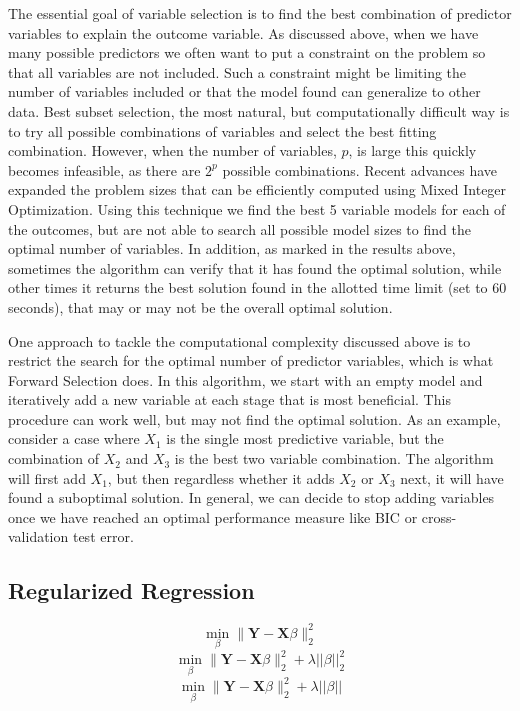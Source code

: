 \documentclass{article}
\newcommand{\bX}{\mathbf{X}}
\newcommand{\bY}{\mathbf{Y}}
\begin{document}
The essential goal of variable selection is to find the best combination of predictor variables to explain the outcome variable. As 
discussed above, when we have many possible predictors we often want to put a constraint on the problem so that all variables 
are not included. Such a constraint might be limiting the number of variables included or that the model found can generalize to 
other data. Best subset selection, the most natural, but computationally difficult way is to try all possible combinations of variables and select the best fitting combination. However, when the number of variables, $p$, is large this quickly becomes infeasible, as there are $2^p$ possible combinations. Recent advances have expanded the problem sizes that can be efficiently computed using Mixed Integer Optimization. Using this technique we find the best 5 variable models for each of the outcomes, but are not able to search all possible model sizes to find the optimal number of variables. In addition, as marked in the results above, sometimes the algorithm can verify that it has found the optimal solution, while other times it returns the best solution found in the allotted time limit (set to 60 seconds), that may or may not be the overall optimal solution.

One approach to tackle the computational complexity discussed above is to restrict the search for the optimal number of 
predictor variables, which is what Forward Selection does. In this algorithm, we start with an empty model and iteratively add a 
new variable at each stage that is most beneficial. This procedure can work well, but may not find the optimal solution. As an example, consider a case where $X_1$ is the single most predictive variable, but the combination of $X_2$ and $X_3$ is the best two variable combination. The algorithm will first add $X_1$, but then regardless whether it adds $X_2$ or $X_3$ next, it will have found a suboptimal solution. In general, we can decide to stop adding variables once we have reached an optimal performance measure like BIC or cross-validation test error.


\subsection{Regularized Regression}


	\[\min_{\beta}  \|\bY - \bX\beta\|_{2}^{2} \tag{linear model}\]
	\[\min_{\beta}  \|\bY - \bX\beta\|_{2}^{2} + \lambda||\beta||_2^2 \tag{ridge regression}\]
	\[\min_{\beta}  \|\bY - \bX\beta\|_{2}^{2} + \lambda||\beta|| \tag{LASSO}\]
\end{document}
